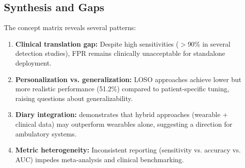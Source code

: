 \begin{table}[htbp]
\centering
\small
\caption{Performance Metrics Reporting Across Studies}
\label{tab:metrics-summary}
\end{table}

\subsection{Synthesis and Gaps}

The concept matrix reveals several patterns:

\begin{enumerate}
  \item \textbf{Clinical translation gap:} Despite high sensitivities ($>$90\% in several detection studies), FPR remains clinically unacceptable for standalone deployment.
  \item \textbf{Personalization vs. generalization:} LOSO approaches achieve lower but more realistic performance (51.2\%) compared to patient-specific tuning, raising questions about generalizability.
  \item \textbf{Diary integration:} \parencite{vielufSeizureMonitoringCombined2025} demonstrates that hybrid approaches (wearable + clinical data) may outperform wearables alone, suggesting a direction for ambulatory systems.
  \item \textbf{Metric heterogeneity:} Inconsistent reporting (sensitivity vs. accuracy vs. AUC) impedes meta-analysis and clinical benchmarking.
\end{enumerate}
